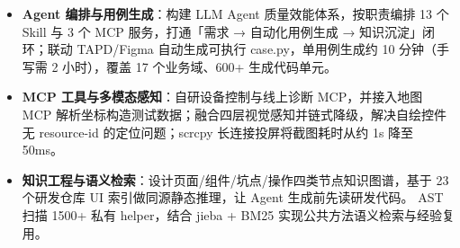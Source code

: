 \documentclass[10pt]{article}
\begin{document}
    \begin{itemize}
        \item \textbf{Agent 编排与用例生成}：构建 LLM Agent 质量效能体系，按职责编排 13 个 Skill 与 3 个 MCP 服务，打通「需求 → 自动化用例生成 → 知识沉淀」闭环；联动 TAPD/Figma 自动生成可执行 case.py，单用例生成约 10 分钟（手写需 2 小时），覆盖 17 个业务域、600+ 生成代码单元。
        \item \textbf{MCP 工具与多模态感知}：自研设备控制与线上诊断 MCP，并接入地图 MCP 解析坐标构造测试数据；融合四层视觉感知并链式降级，解决自绘控件无 resource-id 的定位问题；scrcpy 长连接投屏将截图耗时从约 1s 降至 50ms。
        \item \textbf{知识工程与语义检索}：设计页面/组件/坑点/操作四类节点知识图谱，基于 23 个研发仓库 UI 索引做同源静态推理，让 Agent 生成前先读研发代码。 AST 扫描 1500+ 私有 helper，结合 jieba + BM25 实现公共方法语义检索与经验复用。
    \end{itemize}


\end{document}
